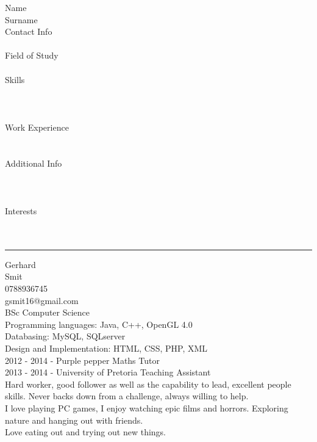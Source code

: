 \documentclass[letterpaper]{article}
\begin{document}
	\vspace*{0.2in}
	\begin{minipage}{0.26\linewidth}
			Name 			\\
			Surname			\\
			Contact Info 	\\
							\\
			Field of Study	\\
							\\
			Skills			\\
							\\
							\\
							\\
			Work Experience	\\
							\\
							\\
			Additional Info	\\
							\\
							\\
							\\
			Interests		\\
							\\
							\\
	\end{minipage}
	\begin{minipage}{0.02\linewidth}
		\rule{1pt}{250pt}
	\end{minipage}
	\begin{minipage}{0.85\linewidth}
		Gerhard \\
		Smit \\
		0788936745 \\
		gsmit16@gmail.com \\
		BSc Computer Science \\
						
		Programming languages: Java, C++, OpenGL 4.0 \\
		Databasing: MySQL, SQLserver \\
		Design and Implementation: HTML, CSS, PHP, XML \\ 
		
		2012 - 2014 - Purple pepper Maths Tutor \\
		2013 - 2014 - University of Pretoria Teaching Assistant \\

		Hard worker, good follower as well as the capability to lead, excellent people skills. Never backs down from a challenge, always willing to help. \\
						
		I love playing PC games, I enjoy watching epic films and horrors. Exploring nature and hanging out with friends. \\
		Love eating out and trying out new things. \\

	\end{minipage}
	
\end{document}
